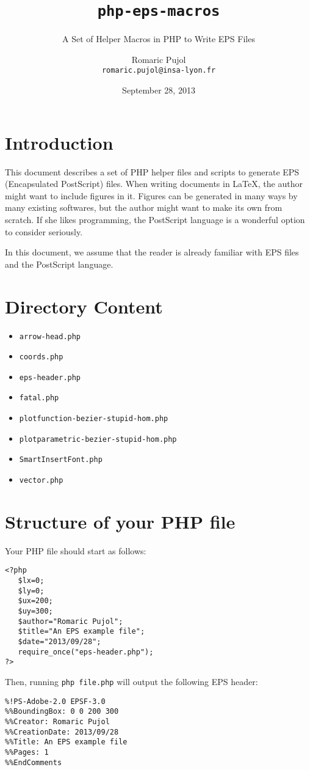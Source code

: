 \documentclass[10pt,a4paper]{scrartcl}
\title{\texttt{php-eps-macros}}
\subtitle{A Set of Helper Macros in PHP to Write EPS Files}
\author{Romaric Pujol\\\footnotesize{\texttt{romaric.pujol@insa-lyon.fr}}}
\date{September 28, 2013}
\newcommand\code[1]{\lstinline{#1}}
\newcommand\PS{PostScript}
\begin{document}
\maketitle
\section{Introduction}
This document describes a set of PHP helper files and scripts to generate EPS
   (Encapsulated \PS) files.
When writing documents in \LaTeX, the author might want to include figures in
   it.
Figures can be generated in many ways by many existing softwares, but the
   author might want to make its own from scratch.
If she likes programming, the PostScript language is a wonderful option to
   consider seriously.

In this document, we assume that the reader is already familiar with EPS files
and the \PS{} language.

\section{Directory Content}
\begin{itemize}
\item \texttt{arrow-head.php}
\item \texttt{coords.php}
\item \texttt{eps-header.php}
\item \texttt{fatal.php}
\item \texttt{plotfunction-bezier-stupid-hom.php}
\item \texttt{plotparametric-bezier-stupid-hom.php}
\item \texttt{SmartInsertFont.php}
\item \texttt{vector.php}
\end{itemize}

\section{Structure of your PHP file}
Your PHP file should start as follows:
\lstset{language=PHP}
\begin{lstlisting}
<?php
   $lx=0;
   $ly=0;
   $ux=200;
   $uy=300;
   $author="Romaric Pujol";
   $title="An EPS example file";
   $date="2013/09/28";
   require_once("eps-header.php");
?>
\end{lstlisting}

Then, running \code{php file.php} will output the following EPS header:
\begin{lstlisting}
%!PS-Adobe-2.0 EPSF-3.0
%%BoundingBox: 0 0 200 300
%%Creator: Romaric Pujol
%%CreationDate: 2013/09/28
%%Title: An EPS example file
%%Pages: 1
%%EndComments
\end{lstlisting}
\end{document}
